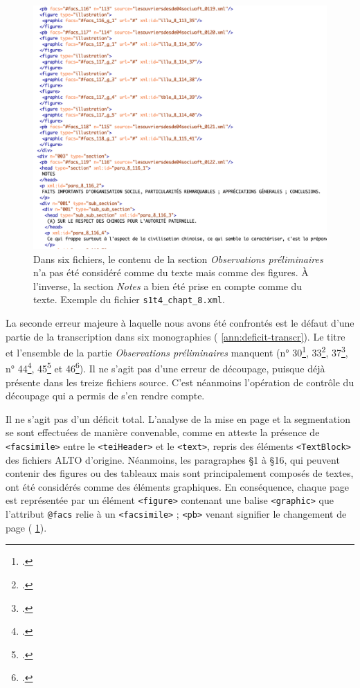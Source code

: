 \begin{figure}[t]
    \centering
    \includegraphics[width=15cm]{img/deficit_transcrip.png}
    \caption{Dans six fichiers, le contenu de la section \textit{Observations préliminaires} n'a pas été considéré comme du texte mais comme des figures. À l'inverse, la section \textit{Notes} a bien été prise en compte comme du texte. Exemple du fichier \texttt{s1t4\_chapt\_8.xml}.}
    \label{fig:deficit}
\end{figure}

La seconde erreur majeure à laquelle nous avons été confrontés est le défaut d'une partie de la transcription dans six monographies (\ann{} \ref{ann:deficit-transcr}). Le titre et l'ensemble de la partie \textit{Observations préliminaires} manquent (n° 30\footcite{mono030a}, 33\footcite{mono033a}, 37\footcite{mono037a}, n° 44\footcite{mono044a}, 45\footcite{mono045a} et 46\footcite{mono046a}). Il ne s'agit pas d'une erreur de découpage, puisque déjà présente dans les treize fichiers source. C'est néanmoins l'opération de contrôle du découpage qui a permis de s'en rendre compte.

Il ne s'agit pas d'un déficit total. L'analyse de la mise en page et la segmentation se sont effectuées de manière convenable, comme en atteste la présence de \texttt{<facsimile>} entre le \texttt{<teiHeader>} et le \texttt{<text>}, repris des éléments \texttt{<TextBlock>} des fichiers ALTO d'origine. Néanmoins, les paragraphes §1 à §16, qui peuvent contenir des figures ou des tableaux mais sont principalement composés de textes, ont été considérés comme des éléments graphiques. En conséquence, chaque page est représentée par un élément \texttt{<figure>} contenant une balise \texttt{<graphic>} que l'attribut \texttt{@facs} relie à un \texttt{<facsimile>} ; \texttt{<pb>} venant signifier le changement de page (\fig{} \ref{fig:deficit}).

